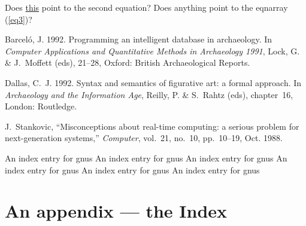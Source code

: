 \documentclass[]{book}
\begin{document}
Does \hyperref{}{equation}{2.5.1}{this} point to the second equation?
Does anything point to the eqnarray (\ref{eq3})?

\begin{thebibliography}{99}
{Barcel\'o, J.} 1992.
\newblock Programming an intelligent database in archaeology. In \emph{Computer
  Applications and Quantitative Methods in Archaeology 1991}, {Lock, G. \&
  J.~Moffett} (eds),   21--28, Oxford: British Archaeological Reports.

{Dallas, C.~J.} 1992.
\newblock Syntax and semantics of figurative art: a formal approach. In
  \emph{Archaeology and the Information Age}, {Reilly, P. \& S.~Rahtz} (eds),
  chapter~16, London: Routledge.

J.~Stankovic, ``Misconceptions about real-time computing: a serious problem for
  next-generation systems,'' {\em Computer}, vol.~21, no.~10, pp.~10--19, Oct.
  1988.

\end{thebibliography}
\clearpage
An index entry for gnus
\clearpage
An index entry for gnus
\clearpage
An index entry for gnus
\clearpage
An index entry for gnus
\clearpage
An index entry for gnus
\clearpage
An index entry for gnus
\chapter*{An appendix --- the Index}
\printindex
\end{document}
